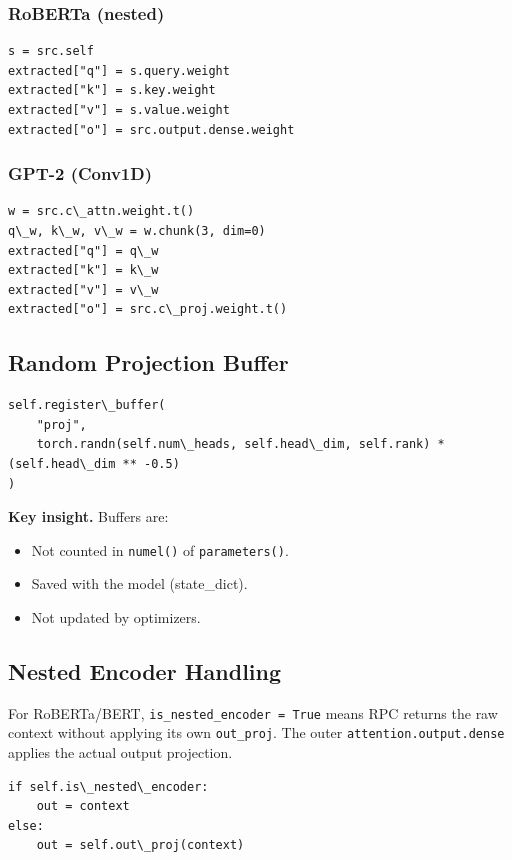 \subsubsection{RoBERTa (nested)}

\begin{lstlisting}
s = src.self
extracted["q"] = s.query.weight
extracted["k"] = s.key.weight
extracted["v"] = s.value.weight
extracted["o"] = src.output.dense.weight
\end{lstlisting}

\subsubsection{GPT-2 (Conv1D)}

\begin{lstlisting}
w = src.c\_attn.weight.t()
q\_w, k\_w, v\_w = w.chunk(3, dim=0)
extracted["q"] = q\_w
extracted["k"] = k\_w
extracted["v"] = v\_w
extracted["o"] = src.c\_proj.weight.t()
\end{lstlisting}

\subsection{Random Projection Buffer}

\begin{lstlisting}
self.register\_buffer(
    "proj",
    torch.randn(self.num\_heads, self.head\_dim, self.rank) * (self.head\_dim ** -0.5)
)
\end{lstlisting}

\textbf{Key insight.} Buffers are:
\begin{itemize}
\item Not counted in \texttt{numel()} of \texttt{parameters()}.
\item Saved with the model (state\_dict).
\item Not updated by optimizers.

\end{itemize}
\subsection{Nested Encoder Handling}

For RoBERTa/BERT, \texttt{is\_nested\_encoder = True} means RPC returns the raw 
context without applying its own \texttt{out\_proj}. The outer \texttt{attention.output.dense} 
applies the actual output projection.

\begin{lstlisting}
if self.is\_nested\_encoder:
    out = context
else:
    out = self.out\_proj(context)
\end{lstlisting}

